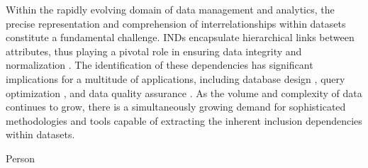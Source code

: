Within the rapidly evolving domain of data management and analytics, the precise representation and comprehension of interrelationships within datasets constitute a fundamental challenge. INDs encapsulate hierarchical links between attributes, thus playing a pivotal role in ensuring data integrity and normalization \cite{casanova1982inclusion}. The identification of these dependencies has significant implications for a multitude of applications, including database design \cite{levene2000justification}, query optimization \cite{gryz1998query}, and data quality assurance \cite{fan2008dependencies}. As the volume and complexity of data continues to grow, there is a simultaneously growing demand for sophisticated methodologies and tools capable of extracting the inherent inclusion dependencies within datasets.

\begin{table}[!t]
\parbox{.42\linewidth}{
%
\caption{Person}
\label{tab:person}
}
\hfill
\parbox{.52\linewidth}{
%
\caption{House}
\label{tab:house}
}
\end{table}

